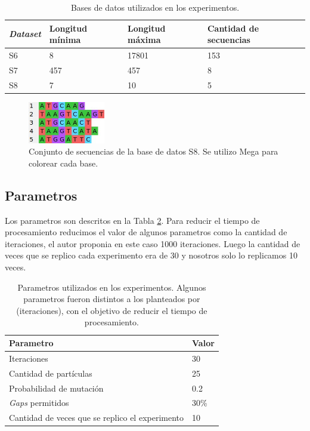 \documentclass{cup-pan}
\begin{document}
	
	\begin{table}[h]
		\centering
		\caption{Bases de datos utilizados en los experimentos.}
		\begin{tabular}{p{2cm}p{2cm}p{2cm}p{2cm}}
			
			\textbf{\textit{Dataset}} & \textbf{Longitud mínima} & \textbf{Longitud máxima} & \textbf{Cantidad de secuencias}\\
			\hline				
			S6  &  8 & 17801 & 153\\
			S7  &  457 & 457 & 8\\
			S8  &  7 & 10 & 5\\
			\hline 
		\end{tabular}		
		\label{tab:datasets2}
	\end{table}

	\begin{figure}[h]
		\centering
		\includegraphics[width=0.3\textwidth]{images/s8}
		\caption{Conjunto de secuencias de la base de datos S8. Se utilizo Mega para colorear cada base.}
		\label{fig:s8}
	\end{figure}
	
	
	

	\subsection{Parametros}
	
	Los parametros son descritos en la Tabla \ref{tab:param}. Para reducir el tiempo de procesamiento reducimos el valor de algunos parametros como la cantidad de iteraciones, el autor proponia en este caso 1000 iteraciones. Luego la cantidad de veces que se replico cada experimento era de 30 y nosotros solo lo replicamos 10 veces.
	
	\begin{table}[h]
		\centering
		\caption{Parametros utilizados en los experimentos. Algunos parametros fueron distintos a los planteados por \citet{zablocki2009multiple} (iteraciones), con el objetivo de reducir el tiempo de procesamiento.}
		\begin{tabular}{p{5cm}p{2cm}}
			
			\textbf{Parametro} & \textbf{Valor} \\
			\hline			
			Iteraciones	& 30		\\				
			Cantidad de partículas & 25 \\
			Probabilidad de mutación & 0.2 \\ 
			\textit{Gaps} permitidos & 30\% \\	
			Cantidad de veces que se replico el experimento & 10 \\		
			\hline 
		\end{tabular}		
		\label{tab:param}
	\end{table}
	
\end{document}
